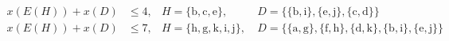 \begin{align*}
x(E(H)) + x(D) &\leq 4, & H= \{\text{b},\text{c},\text{e}\},\ & D=\{\{\text{b},\text{i}\},\{\text{e},\text{j}\},\{\text{c},\text{d}\}\}\\
x(E(H)) + x(D) &\leq 7, & H= \{\text{h},\text{g},\text{k},\text{i},\text{j}\},\ & D=\{\{\text{a},\text{g}\},\{\text{f},\text{h}\},\{\text{d},\text{k}\},\{\text{b},\text{i}\},\{\text{e},\text{j}\}\}\\
\end{align*}
